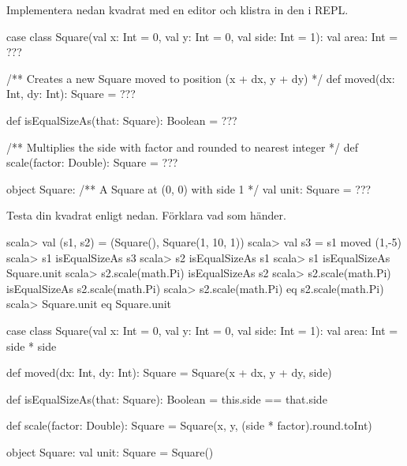 \Subtask Implementera nedan kvadrat med en editor och klistra in den i REPL.

\begin{Code}
case class Square(val x: Int = 0, val y: Int = 0, val side: Int = 1):
  val area: Int = ???

  /** Creates a new Square moved to position (x + dx, y + dy) */
  def moved(dx: Int, dy: Int): Square = ???

  def isEqualSizeAs(that: Square): Boolean = ???

  /** Multiplies the side with factor and rounded to nearest integer */
  def scale(factor: Double): Square = ???

object Square:
  /** A Square at (0, 0) with side 1 */
  val unit: Square = ???
\end{Code}

\Subtask Testa din kvadrat enligt nedan. Förklara vad som händer.

\begin{REPL}
scala> val (s1, s2) = (Square(), Square(1, 10, 1))
scala> val s3 = s1 moved (1,-5)
scala> s1 isEqualSizeAs s3
scala> s2 isEqualSizeAs s1
scala> s1 isEqualSizeAs Square.unit
scala> s2.scale(math.Pi) isEqualSizeAs s2
scala> s2.scale(math.Pi) isEqualSizeAs s2.scale(math.Pi)
scala> s2.scale(math.Pi) eq s2.scale(math.Pi)
scala> Square.unit eq Square.unit
\end{REPL}

\SOLUTION

\TaskSolved \what

\SubtaskSolved

\begin{Code}
case class Square(val x: Int = 0, val y: Int = 0, val side: Int = 1):
  val area: Int = side * side

  def moved(dx: Int, dy: Int): Square = Square(x + dx, y + dy, side)

  def isEqualSizeAs(that: Square): Boolean = this.side == that.side

  def scale(factor: Double): Square =
    Square(x, y, (side * factor).round.toInt)

object Square:
  val unit: Square = Square()
\end{Code}

